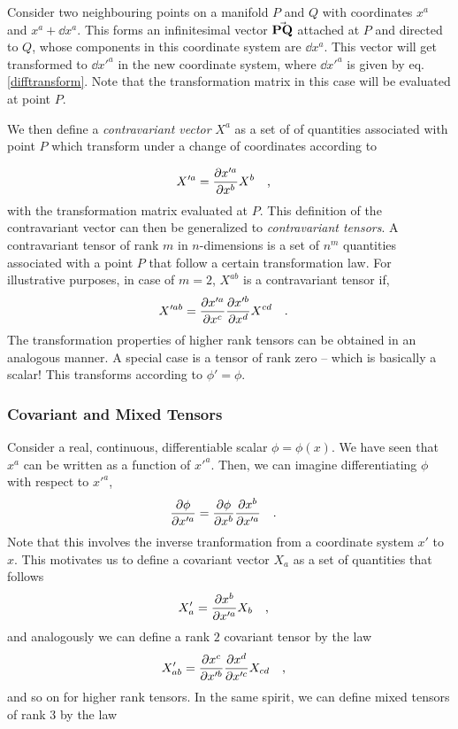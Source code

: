 \documentclass[a4paper,11pt]{article}
\begin{document}
Consider two neighbouring points on a manifold $ P $ and $ Q $ with coordinates $ x^a $ and $ x^a + \dd{x^a} $. This forms an infinitesimal vector $ \va{PQ} $ attached at $ P $ and directed to $ Q $, whose components in this coordinate system are $ \dd{x^a} $. This vector will get transformed to $ \dd{x'^a} $ in the new coordinate system, where $ \dd{x'^a} $ is given by eq. \ref{difftransform}. Note that the transformation matrix in this case will be evaluated at point $ P $.

We then define a \textit{contravariant vector} $ X^a $ as a set of of quantities associated with point $ P $ which transform under a change of coordinates according to

\begin{equation}\label{key}
X'^a = \pdv{x'^a}{x^b} X^b \qq{,}
\end{equation}
with the transformation matrix evaluated at $ P $. This definition of the contravariant vector can then be generalized to \textit{contravariant tensors}. A contravariant tensor of rank $ m $ in $ n $-dimensions is a set of $ n^m $ quantities associated with a point $ P $ that follow a certain transformation law. For illustrative purposes, in case of $ m=2 $, $ X^{ab} $ is a contravariant tensor if,
\begin{equation}\label{key}
X'^{ab} =  \pdv{x'^a}{x^c}  \pdv{x'^b}{x^d} X^{cd} \qq{.}
 \end{equation}
The transformation properties of higher rank tensors can be obtained in an analogous manner. A special case is a tensor of rank zero -- which is basically a scalar! This transforms according to $ \phi' = \phi $.

\subsubsection{Covariant and Mixed Tensors}
Consider a real, continuous, differentiable scalar $ \phi = \phi(x) $. We have seen that $ x^a $ can be written as a function of $ x'^a $. Then, we can imagine differentiating $ \phi $ with respect to $ x'^a $,
\begin{equation}\label{key}
\pdv{\phi}{x'^a} = \pdv{\phi}{x^b} \pdv{x^b}{x'^a} \qq{.}
\end{equation}
Note that this involves the inverse tranformation from a coordinate system $ x' $ to $ x $. This motivates us to define a covariant vector $ X_a $ as a set of quantities that follows
\begin{equation}\label{key}
X'_a = \pdv{x^b}{x'^a} X_b \qq{,}
\end{equation}
and analogously we can define a rank $ 2 $ covariant tensor by the law
\begin{equation}\label{key}
X'_{ab} = \pdv{x^c}{x'^b} \pdv{x^d}{x'^c} X_{cd} \qq{,}
\end{equation}
and so on for higher rank tensors. In the same spirit, we can define mixed tensors of rank $ 3 $ by the law
\end{document}
